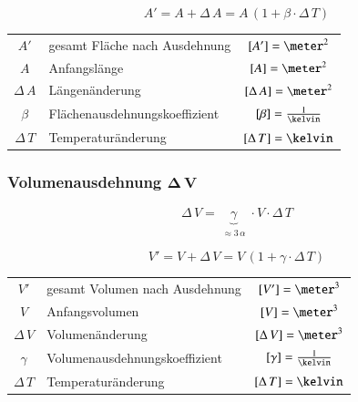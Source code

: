 $$ \boxed{ A' = A + \Delta \,  A = A \, (1 + \beta \cdot \Delta \, T ) } $$


\begin{tabular}{c l c}
		$A'$ 			& gesamt Fläche nach Ausdehnung 		& $[A'] = \meter^2$ 			\\
		$A$ 			& Anfangslänge 					& $[A] = \meter^2$ 				\\
		$\Delta \, A$	& Längenänderung 				& $[\Delta \, A] = \meter^2$ 	\\
		$\beta$ 		& Flächenausdehnungskoeffizient & $[\beta] = \frac{1}{\kelvin}$ \\ 
		$\Delta \, T $ 	& Temperaturänderung 			& $[\Delta \, T ] = \kelvin$
\end{tabular}


\subsubsection{Volumenausdehnung $\bm{\Delta \, V}$}

$$\boxed{\Delta \,  V = \underbrace{  \gamma }_{\substack{\approx 3 \, \alpha}}  \cdot V \cdot \Delta \, T}$$

$$ \boxed{ V' = V + \Delta \,  V = V \, (1 + \gamma \cdot \Delta \, T ) }$$


\begin{tabular}{c l c}
		$V'$ 			& gesamt Volumen nach Ausdehnung 		& $[V'] = \meter^3$ 			\\
		$V$ 			& Anfangsvolumen 				& $[V] = \meter^3$ 				\\
		$\Delta \, V$ 	& Volumenänderung 				& $[\Delta \, V] = \meter^3$ 	\\
		$\gamma$ 		& Volumenausdehnungskoeffizient & $[\gamma] = \frac{1}{\kelvin}$ \\ 
		$\Delta \, T$ 	& Temperaturänderung 			& $[\Delta \, T ] = \kelvin$
\end{tabular}

\columnbreak
